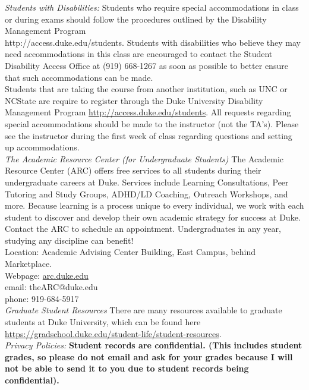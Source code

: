 \documentclass[11pt]{article}
\begin{document}
\emph{Students with Disabilities:} Students who require special accommodations in class or during exams should follow the procedures outlined by the Disability Management Program \\ http://access.duke.edu/students. Students with disabilities who believe they may need accommodations in this class are encouraged to contact the Student Disability Access Office at (919) 668-1267 as soon as possible to better ensure that such accommodations can be made. \\

Students that are taking the course from another institution, such as UNC or NCState are require to register through the Duke University Disability Management Program \url{http://access.duke.edu/students}. All requests regarding special accommodations should be made to the instructor (not the TA's). Please see the instructor during the first week of class regarding questions and setting up accommodations. \\

\emph{The Academic Resource Center (for Undergraduate Students)}
The Academic Resource Center (ARC) offers free services to all students during their undergraduate careers at Duke.  Services include Learning Consultations, Peer Tutoring and Study Groups, ADHD/LD Coaching, Outreach Workshops, and more. Because learning is a process unique to every individual, we work with each student to discover and develop their own academic strategy for success at Duke. Contact the ARC to schedule an appointment. Undergraduates in any year, studying any discipline can benefit! \\
Location: Academic Advising Center Building, East Campus,  behind Marketplace. \\
Webpage: \url{arc.duke.edu}\\
email: theARC@duke.edu \\
phone: 919-684-5917\\

\emph{Graduate Student Resources} There are many resources available to graduate students at Duke University, which can be found here \url{https://gradschool.duke.edu/student-life/student-resources}.\\

\emph{Privacy Policies:} 
\textbf{Student records are confidential. (This includes student grades, so please do not email and ask for your grades because I will not be able to send it to you due to student records being confidential).}
\end{document}
